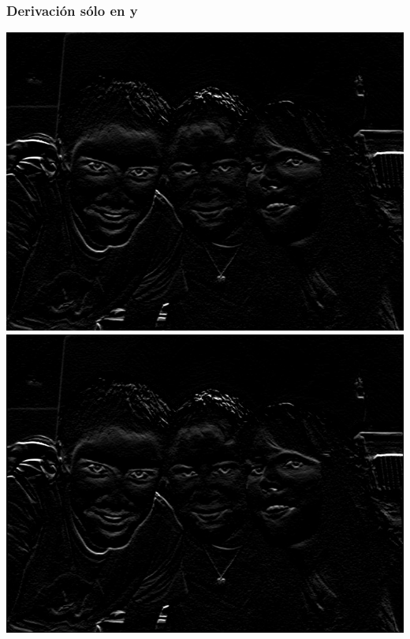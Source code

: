 \documentclass[a4paper, 10pt]{article}
\begin{document}
\subsubsection{Derivaci\'on s\'olo en y}
\begin{center}
	\includegraphics[scale=0.30]{Graficos/out/cvSobelY_foto3.jpg}
	\includegraphics[scale=0.30]{Graficos/out/sobelY_foto3.jpg}
\end{center}
\end{document}
